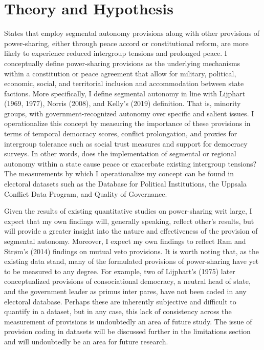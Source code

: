 \documentclass[12pt]{article}
\begin{document}
\section{Theory and Hypothesis}
States that employ segmental autonomy provisions along with other provisions of power-sharing, either through peace accord or constitutional reform, are more likely to experience reduced intergroup tensions and prolonged peace. I conceptually define power-sharing provisions as the underlying mechanisms within a constitution or peace agreement that allow for military, political, economic, social, and territorial inclusion and accommodation between state factions. More specifically, I define segmental autonomy in line with Lijphart (1969, 1977), Norris (2008), and Kelly’s (2019) definition. That is, minority groups, with government-recognized autonomy over specific and salient issues. I operationalize this concept by measuring the importance of these provisions in terms of temporal democracy scores, conflict prolongation, and proxies for intergroup tolerance such as social trust measures and support for democracy surveys. In other words, does the implementation of segmental or regional autonomy within a state cause peace or exacerbate existing intergroup tensions? The measurements by which I operationalize my concept can be found in electoral datasets such as the Database for Political Institutions, the Uppsala Conflict Data Program, and Quality of Governance. 

Given the results of existing quantitative studies on power-sharing writ large, I expect that my own findings will, generally speaking, reflect other’s results, but will provide a greater insight into the nature and effectiveness of the provision of segmental autonomy. Moreover, I expect my own findings to reflect Ram and Strøm’s (2014) findings on mutual veto provisions. It is worth noting that, as the existing data stand, many of the formulated provisions of power-sharing have yet to be measured to any degree. For example, two of Lijphart’s (1975) later conceptualized provisions of consociational democracy, a neutral head of state, and the government leader as primus inter pares, have not been coded in any electoral database. Perhaps these are inherently subjective and difficult to quantify in a dataset, but in any case, this lack of consistency across the measurement of provisions is undoubtedly an area of future study. The issue of provision coding in datasets will be discussed further in the limitations section and will undoubtedly be an area for future research. 
\end{document}
